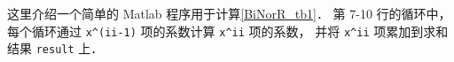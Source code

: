 
这里介绍一个简单的 Matlab 程序用于计算\autoref{BiNorR_tb1}． 第 7-10 行的循环中， 每个循环通过 \texttt{x\^{}(ii-1)} 项的系数计算 \texttt{x\^{}ii} 项的系数， 并将 \texttt{x\^{}ii} 项累加到求和结果 \texttt{result} 上．

